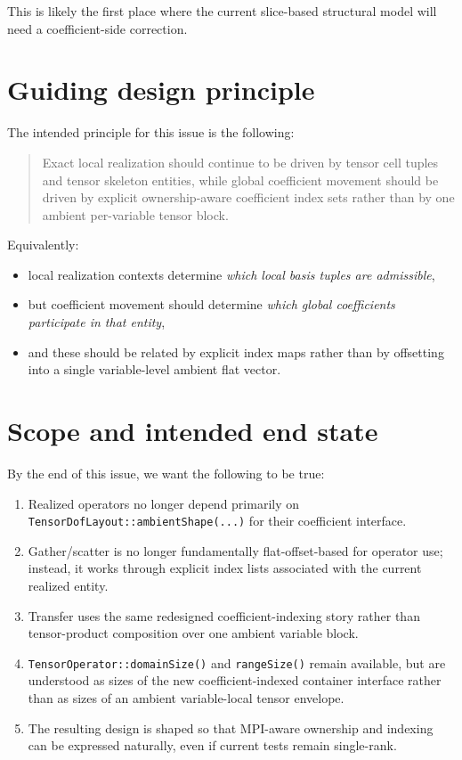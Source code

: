 \documentclass[11pt]{article}
\begin{document}
This is likely the first place where the current slice-based structural model will need a coefficient-side correction.

\section{Guiding design principle}

The intended principle for this issue is the following:

\begin{quote}
Exact local realization should continue to be driven by tensor cell tuples and tensor skeleton entities, while global coefficient movement should be driven by explicit ownership-aware coefficient index sets rather than by one ambient per-variable tensor block.
\end{quote}

Equivalently:
\begin{itemize}[leftmargin=2em]
\item local realization contexts determine \emph{which local basis tuples are admissible},
\item but coefficient movement should determine \emph{which global coefficients participate in that entity},
\item and these should be related by explicit index maps rather than by offsetting into a single variable-level ambient flat vector.
\end{itemize}

\section{Scope and intended end state}

By the end of this issue, we want the following to be true:

\begin{enumerate}[leftmargin=2em]
\item Realized operators no longer depend primarily on \texttt{TensorDofLayout::ambientShape(...)} for their coefficient interface.
\item Gather/scatter is no longer fundamentally flat-offset-based for operator use; instead, it works through explicit index lists associated with the current realized entity.
\item Transfer uses the same redesigned coefficient-indexing story rather than tensor-product composition over one ambient variable block.
\item \texttt{TensorOperator::domainSize()} and \texttt{rangeSize()} remain available, but are understood as sizes of the new coefficient-indexed container interface rather than as sizes of an ambient variable-local tensor envelope.
\item The resulting design is shaped so that MPI-aware ownership and indexing can be expressed naturally, even if current tests remain single-rank.
\end{enumerate}
\end{document}
